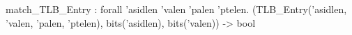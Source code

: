 match_TLB_Entry : forall 'asidlen 'valen 'palen 'ptelen.
  (TLB_Entry('asidlen, 'valen, 'palen, 'ptelen), bits('asidlen), bits('valen)) -> bool
